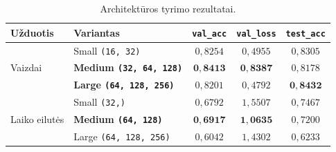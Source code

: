 \begin{table}[H]
    \centering
    \caption{Architektūros tyrimo rezultatai.}
    \begin{tabular}{|l|l|c|c|c|}
        \hline
        Užduotis & Variantas & \texttt{val\_acc} & \texttt{val\_loss} & \texttt{test\_acc} \\
        \hline
        \multirow{3}{*}{Vaizdai}
            & Small \texttt{(16, 32)}        & $0{,}8254$ & $0{,}4955$ & $0{,}8305$ \\ \cline{2-5}
            & \textbf{Medium \texttt{(32, 64, 128)}} & $\mathbf{0{,}8413}$ & $\mathbf{0{,}8387}$ & $0{,}8178$ \\ \cline{2-5}
            & \textbf{Large \texttt{(64, 128, 256)}} & $0{,}8201$ & $0{,}4792$ & $\mathbf{0{,}8432}$ \\
        \hline
        \multirow{3}{*}{Laiko eilutės}
            & Small \texttt{(32,)}           & $0{,}6792$ & $1{,}5507$ & $0{,}7467$ \\ \cline{2-5}
            & \textbf{Medium \texttt{(64, 128)}} & $\mathbf{0{,}6917}$ & $\mathbf{1{,}0635}$ & $0{,}7200$ \\ \cline{2-5}
            & Large \texttt{(64, 128, 256)}  & $0{,}6042$ & $1{,}4302$ & $0{,}6233$ \\
        \hline
    \end{tabular}
    \label{tab:rez_architektura}
\end{table}
